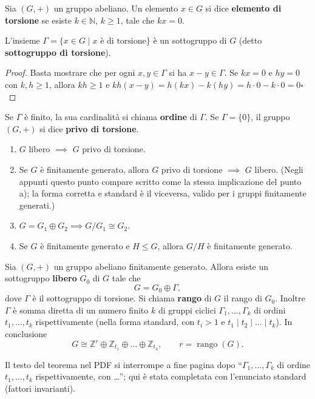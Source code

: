 \begin{definicion}
Sia $(G, +)$ un gruppo abeliano. Un elemento $x \in G$ si dice \textbf{elemento di torsione} se esiste $k \in \mathbb{N}$, $k \geqslant 1$, tale che $kx = 0$.
\end{definicion}

\begin{prop}
L'insieme $\Gamma = \{ x \in G \mid x \text{ \`e di torsione} \}$ \`e un sottogruppo di $G$ (detto \textbf{sottogruppo di torsione}).
\end{prop}
\begin{proof}
Basta mostrare che per ogni $x, y \in \Gamma$ si ha $x - y \in \Gamma$. Se $kx = 0$ e $hy = 0$ con $k, h \geqslant 1$, allora $kh \geqslant 1$ e $kh(x - y) = h(kx) - k(hy) = h \cdot 0 - k \cdot 0 = 0$\hfill$\square$
\end{proof}

\begin{definicion}
Se $\Gamma$ \`e finito, la sua cardinalit\`a si chiama \textbf{ordine} di $\Gamma$. Se $\Gamma = \{0\}$, il gruppo $(G, +)$ si dice \textbf{privo di torsione}.
\end{definicion}

\begin{prop}[Propriet\`a]
\begin{enumerate}
    \item[a)] $G$ libero $\implies$ $G$ privo di torsione.
    \item[b)] Se $G$ \`e finitamente generato, allora $G$ privo di torsione $\implies$ $G$ libero. (Negli appunti questo punto compare scritto come la stessa implicazione del punto a); la forma corretta e standard \`e il viceversa, valido per i gruppi finitamente generati.)
    \item[c)] $G = G_1 \oplus G_2 \implies G/G_1 \cong G_2$.
    \item[d)] Se $G$ \`e finitamente generato e $H \leqslant G$, allora $G/H$ \`e finitamente generato.
\end{enumerate}
\end{prop}

\begin{teo}
Sia $(G, +)$ un gruppo abeliano finitamente generato. Allora esiste un sottogruppo \textbf{libero} $G_0$ di $G$ tale che
\[
G = G_0 \oplus \Gamma ,
\]
dove $\Gamma$ \`e il sottogruppo di torsione. Si chiama \textbf{rango} di $G$ il rango di $G_0$. Inoltre $\Gamma$ \`e somma diretta di un numero finito $k$ di gruppi ciclici $\Gamma_1, \dots, \Gamma_k$ di ordini $t_1, \dots, t_k$ rispettivamente (nella forma standard, con $t_i > 1$ e $t_1 \mid t_2 \mid \dots \mid t_k$). In conclusione
\[
G \cong \mathbb{Z}^r \oplus \mathbb{Z}_{t_1} \oplus \dots \oplus \mathbb{Z}_{t_k}, \qquad r = \operatorname{rango}(G).
\]
\end{teo}
\begin{observacion}
Il testo del teorema nel PDF si interrompe a fine pagina dopo ``$\Gamma_1, \dots, \Gamma_k$ di ordine $t_1, \dots, t_k$ rispettivamente, con \dots''; qui \`e stata completata con l'enunciato standard (fattori invarianti).
\end{observacion}


